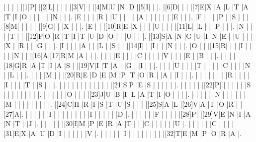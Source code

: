 \documentclass[12pt]{article}
\begin{document}
\begin{Puzzle}{22}{25}
  |{}  |{}  |{}  |{}  |[1]P|{}  |[2]L|{}  |{}  |{}  |{}  |[3]V|{}  |{}  |[4]M|U   |N   |D   |[5]I|{}  |{}  |.
  |[6]D|{}  |{}  |{}  |[7]E|X   |A   |L   |T   |A   |T   |I   |O   |{}  |{}  |{}  |{}  |{}  |N   |{}  |{}  |.
  |E   |{}  |{}  |{}  |R   |{}  |U   |{}  |{}  |{}  |{}  |A   |{}  |{}  |{}  |{}  |{}  |{}  |E   |{}  |{}  |.
  |F   |{}  |{}  |{}  |P   |{}  |S   |{}  |{}  |[8]M|{}  |{}  |{}  |{}  |{}  |[9]G|{}  |{}  |X   |{}  |{}  |.
  |E   |{}  |{}  |[10]R|E   |X   |{}  |{}  |{}  |U   |{}  |{}  |{}  |[11]L|{}  |L   |{}  |{}  |P   |{}  |{}  |.
  |N   |{}  |{}  |{}  |T   |{}  |{}  |[12]F|O   |R   |T   |I   |T   |U   |D   |O   |{}  |{}  |U   |{}  |{}  |.
  |[13]S|A   |N   |G   |U   |I   |N   |E   |{}  |U   |{}  |{}  |{}  |X   |{}  |R   |{}  |{}  |G   |{}  |{}  |.
  |I   |{}  |{}  |{}  |A   |{}  |{}  |L   |{}  |S   |{}  |{}  |[14]I|{}  |{}  |I   |{}  |{}  |N   |{}  |{}  |.
  |O   |{}  |{}  |[15]R|{}  |{}  |{}  |I   |{}  |{}  |{}  |{}  |N   |{}  |{}  |[16]A|[17]R|M   |A   |{}  |{}  |.
  |{}  |{}  |{}  |E   |{}  |{}  |{}  |C   |{}  |{}  |{}  |{}  |V   |{}  |{}  |{}  |E   |{}  |B   |{}  |{}  |.
  |{}  |{}  |{}  |[18]G|R   |A   |T   |I   |A   |S   |{}  |[19]V|I   |T   |A   |{}  |G   |{}  |I   |{}  |{}  |.
  |{}  |{}  |{}  |U   |{}  |{}  |{}  |T   |{}  |{}  |{}  |{}  |C   |{}  |{}  |{}  |N   |{}  |L   |{}  |{}  |.
  |{}  |{}  |{}  |M   |{}  |{}  |[20]R|E   |D   |E   |M   |P   |T   |O   |R   |{}  |A   |{}  |I   |{}  |{}  |.
  |{}  |{}  |{}  |{}  |{}  |{}  |{}  |R   |{}  |{}  |{}  |{}  |I   |{}  |{}  |{}  |T   |{}  |S   |{}  |{}  |.
  |{}  |{}  |{}  |{}  |{}  |{}  |{}  |{}  |{}  |{}  |{}  |{}  |[21]S|P   |E   |S   |{}  |{}  |{}  |{}  |{}  |.
  |{}  |{}  |{}  |{}  |{}  |[22]P|{}  |{}  |{}  |{}  |{}  |{}  |S   |{}  |{}  |{}  |{}  |{}  |{}  |{}  |{}  |.
  |{}  |{}  |{}  |{}  |{}  |O   |{}  |{}  |{}  |[23]J|U   |B   |I   |L   |A   |T   |I   |O   |{}  |{}  |{}  |.
  |{}  |{}  |{}  |{}  |{}  |N   |{}  |{}  |{}  |{}  |{}  |{}  |M   |{}  |{}  |{}  |{}  |{}  |{}  |{}  |{}  |.
  |[24]C|H   |R   |I   |S   |T   |U   |S   |{}  |{}  |{}  |[25]S|A   |L   |[26]V|A   |T   |O   |R   |{}  |[27]A|.
  |{}  |{}  |{}  |{}  |{}  |I   |{}  |{}  |{}  |{}  |{}  |{}  |{}  |{}  |I   |{}  |{}  |{}  |{}  |{}  |D   |.
  |{}  |{}  |{}  |{}  |{}  |F   |{}  |{}  |{}  |{}  |[28]P|{}  |[29]V|E   |N   |I   |A   |N   |T   |{}  |J   |.
  |{}  |{}  |{}  |{}  |{}  |[30]I|M   |P   |E   |R   |A   |T   |{}  |{}  |C   |{}  |{}  |{}  |{}  |{}  |U   |.
  |{}  |{}  |{}  |{}  |{}  |C   |{}  |{}  |{}  |[31]E|X   |A   |U   |D   |I   |{}  |{}  |{}  |{}  |{}  |V   |.
  |{}  |{}  |{}  |{}  |{}  |I   |{}  |{}  |{}  |{}  |{}  |{}  |{}  |{}  |[32]T|E   |M   |P   |O   |R   |A   |.
\end{Puzzle}
\end{document}
